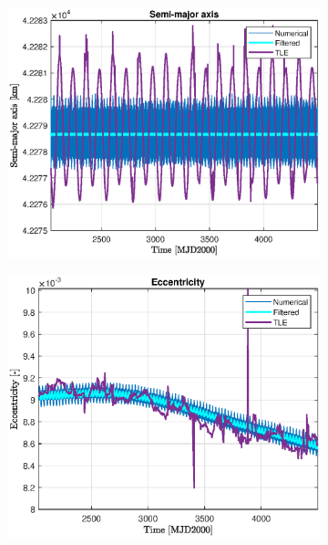 \documentclass{article}
\begin{document}
\begin{figure}[H]
	\centering
	\begin{subfigure}[b]{0.45\textwidth}
		\includegraphics[width=\textwidth]{a_TLE.eps}
		\caption{}
		\label{fig:1a}
	\end{subfigure}%
    \hfill
	\begin{subfigure}[b]{0.45\textwidth}
		\includegraphics[width=\textwidth]{e_TLE.eps}
		\caption{}
		\label{fig:1b}
	\end{subfigure}%
	

\end{figure}
\end{document}
